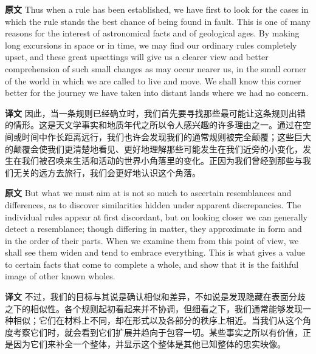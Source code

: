\documentclass[UTF8]{ctexart}
\newenvironment{english}{\par\small\noindent\textbf{原文}\quad\ignorespaces}{\par}
\newenvironment{zhtranslation}{\par\noindent\textbf{译文}\quad\ignorespaces}{\par\vspace{0.35em}}
\begin{document}
\begin{english}
Thus when a rule has been established, we have first to look for the cases in which the rule stands the best chance of being found in fault. This is one of many reasons for the interest of astronomical facts and of geological ages. By making long excursions in space or in time, we may find our ordinary rules completely upset, and these great upsettings will give us a clearer view and better comprehension of such small changes as may occur nearer us, in the small corner of the world in which we are called to live and move. We shall know this corner better for the journey we have taken into distant lands where we had no concern.
\end{english}
\begin{zhtranslation}
因此，当一条规则已经确立时，我们首先要寻找那些最可能让这条规则出错的情形。这是天文学事实和地质年代之所以令人感兴趣的许多理由之一。通过在空间或时间中作长距离远行，我们也许会发现我们的通常规则被完全颠覆；这些巨大的颠覆会使我们更清楚地看见、更好地理解那些可能发生在我们近旁的小变化，发生在我们被召唤来生活和活动的世界小角落里的变化。正因为我们曾经到那些与我们无关的远方去旅行，我们会更好地认识这个角落。\end{zhtranslation}

\begin{english}
But what we must aim at is not so much to ascertain resemblances and differences, as to discover similarities hidden under apparent discrepancies. The individual rules appear at first discordant, but on looking closer we can generally detect a resemblance; though differing in matter, they approximate in form and in the order of their parts. When we examine them from this point of view, we shall see them widen and tend to embrace everything. This is what gives a value to certain facts that come to complete a whole, and show that it is the faithful image of other known wholes.
\end{english}
\begin{zhtranslation}
不过，我们的目标与其说是确认相似和差异，不如说是发现隐藏在表面分歧之下的相似性。各个规则起初看起来并不协调，但细看之下，我们通常能够发现一种相似；它们在材料上不同，却在形式以及各部分的秩序上相近。当我们从这个角度考察它们时，就会看到它们扩展并趋向于包容一切。某些事实之所以有价值，正是因为它们来补全一个整体，并显示这个整体是其他已知整体的忠实映像。\end{zhtranslation}
\end{document}
